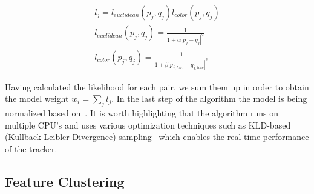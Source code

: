 \begin{eqnarray}
  l_{j} = l_{euclidean}(p_{j},q_{j})l_{color}(p_{j},q_{j}) \nonumber \\
  l_{euclidean}(p_{j},q_{j}) = \frac{1}{1+\alpha|p_{j}-q_{j}|^2} \nonumber \\
  l_{color}(p_{j},q_{j}) = \frac{1}{1+\beta|p_{j,hsv}-q_{j,hsv}|^2} 
  \label{eq:likelihood}
\end{eqnarray} 

Having calculated the likelihood for each pair, we sum them up in order to obtain the model weight $w_{i} = \sum\limits_{j}l_{j}$. In the last step of the algorithm the model is being normalized based on~\cite{AzadMAD11}. It is worth highlighting that the algorithm runs on multiple CPU's and uses various optimization techniques such as KLD-based 
(Kullback-Leibler Divergence) sampling~\cite{Fox01KLD} which enables the real time performance of the tracker.


\subsection{Feature Clustering}

\label{sec:clustering}


